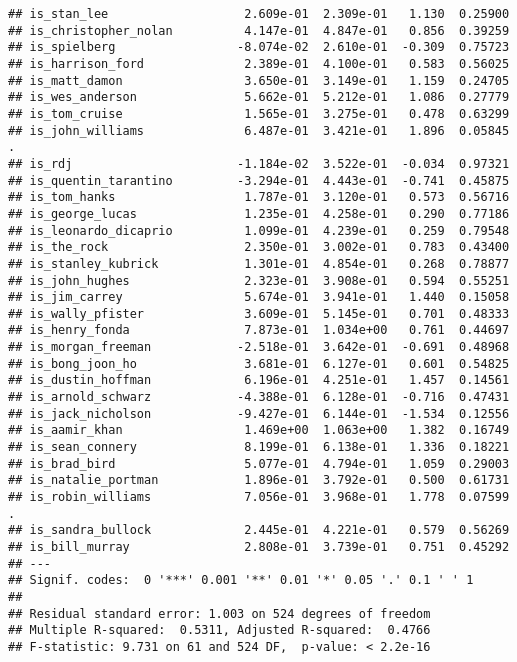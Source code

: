 \documentclass[
]{article}
\begin{document}
\begin{verbatim}
## is_stan_lee                   2.609e-01  2.309e-01   1.130  0.25900   
## is_christopher_nolan          4.147e-01  4.847e-01   0.856  0.39259   
## is_spielberg                 -8.074e-02  2.610e-01  -0.309  0.75723   
## is_harrison_ford              2.389e-01  4.100e-01   0.583  0.56025   
## is_matt_damon                 3.650e-01  3.149e-01   1.159  0.24705   
## is_wes_anderson               5.662e-01  5.212e-01   1.086  0.27779   
## is_tom_cruise                 1.565e-01  3.275e-01   0.478  0.63299   
## is_john_williams              6.487e-01  3.421e-01   1.896  0.05845 . 
## is_rdj                       -1.184e-02  3.522e-01  -0.034  0.97321   
## is_quentin_tarantino         -3.294e-01  4.443e-01  -0.741  0.45875   
## is_tom_hanks                  1.787e-01  3.120e-01   0.573  0.56716   
## is_george_lucas               1.235e-01  4.258e-01   0.290  0.77186   
## is_leonardo_dicaprio          1.099e-01  4.239e-01   0.259  0.79548   
## is_the_rock                   2.350e-01  3.002e-01   0.783  0.43400   
## is_stanley_kubrick            1.301e-01  4.854e-01   0.268  0.78877   
## is_john_hughes                2.323e-01  3.908e-01   0.594  0.55251   
## is_jim_carrey                 5.674e-01  3.941e-01   1.440  0.15058   
## is_wally_pfister              3.609e-01  5.145e-01   0.701  0.48333   
## is_henry_fonda                7.873e-01  1.034e+00   0.761  0.44697   
## is_morgan_freeman            -2.518e-01  3.642e-01  -0.691  0.48968   
## is_bong_joon_ho               3.681e-01  6.127e-01   0.601  0.54825   
## is_dustin_hoffman             6.196e-01  4.251e-01   1.457  0.14561   
## is_arnold_schwarz            -4.388e-01  6.128e-01  -0.716  0.47431   
## is_jack_nicholson            -9.427e-01  6.144e-01  -1.534  0.12556   
## is_aamir_khan                 1.469e+00  1.063e+00   1.382  0.16749   
## is_sean_connery               8.199e-01  6.138e-01   1.336  0.18221   
## is_brad_bird                  5.077e-01  4.794e-01   1.059  0.29003   
## is_natalie_portman            1.896e-01  3.792e-01   0.500  0.61731   
## is_robin_williams             7.056e-01  3.968e-01   1.778  0.07599 . 
## is_sandra_bullock             2.445e-01  4.221e-01   0.579  0.56269   
## is_bill_murray                2.808e-01  3.739e-01   0.751  0.45292   
## ---
## Signif. codes:  0 '***' 0.001 '**' 0.01 '*' 0.05 '.' 0.1 ' ' 1
## 
## Residual standard error: 1.003 on 524 degrees of freedom
## Multiple R-squared:  0.5311, Adjusted R-squared:  0.4766 
## F-statistic: 9.731 on 61 and 524 DF,  p-value: < 2.2e-16
\end{verbatim}
\end{document}
